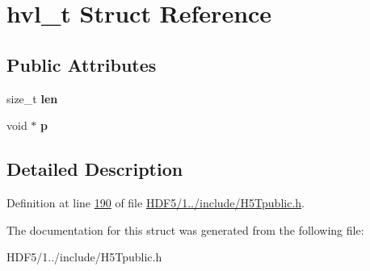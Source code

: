\hypertarget{structhvl__t}{}\section{hvl\+\_\+t Struct Reference}
\label{structhvl__t}
\subsection*{Public Attributes}
\begin{DoxyCompactItemize}
\item 
\mbox{\label{structhvl__t_a7ce1cdb2e8a996bda404bda9626b7903}} 
size\+\_\+t {\bfseries len}
\item 
\mbox{\label{structhvl__t_afc4ea035c85cc40af3b7b425b9722d24}} 
void $\ast$ {\bfseries p}
\end{DoxyCompactItemize}


\subsection{Detailed Description}


Definition at line \hyperlink{_h_d_f5_21_810_81_2include_2_h5_tpublic_8h_source_l00190}{190} of file \hyperlink{_h_d_f5_21_810_81_2include_2_h5_tpublic_8h_source}{H\+D\+F5/1../include/\+H5\+Tpublic.\+h}.



The documentation for this struct was generated from the following file\+:\begin{DoxyCompactItemize}
\item 
H\+D\+F5/1../include/\+H5\+Tpublic.\+h\end{DoxyCompactItemize}
